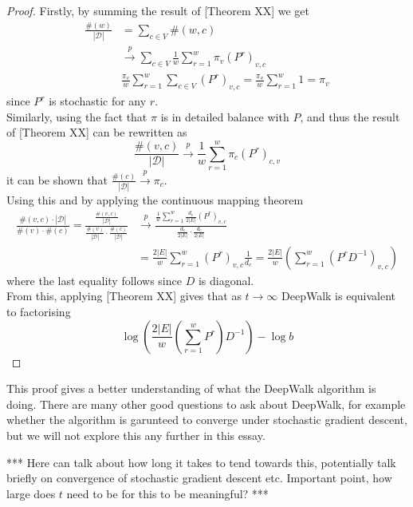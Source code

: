 \documentclass[a4paper]{article}
\newcommand{\D}{\mathcal D}
\begin{document}
\MainDeepWalk*
\begin{proof}
  Firstly, by summing the result of [Theorem XX] we get
  \begin{align*}
    \frac{\#(w)}{|\D|} &= \sum_{c \in V}\#(w, c)\\
                       &\overset{p}{\to} \sum_{c \in V} \frac{1}{w}\sum_{r=1}^w \pi_v(P^r)_{v, c}\\
                       &\frac{\pi_v}{w}\sum_{r = 1}^w \sum_{c \in V}(P^r)_{v,c} = \frac{\pi_v}{w}\sum_{r = 1}^w 1 = \pi_v
  \end{align*}
  since $P^r$ is stochastic for any $r$.\\
  Similarly, using the fact that $\pi$ is in detailed balance with $P$, and thus
  the result of [Theorem XX] can be rewritten as
  \[\frac{\#(v, c)}{|\D|} \overset{p}{\to} \frac{1}{w} \sum_{r = 1}^w \pi_c
    (P^r)_{c,v}\]
  it can be shown that $\frac{\#(c)}{|\D|} \overset{p}{\to} \pi_c$.\\
  Using this and by applying the continuous mapping theorem
  \begin{align*}
    \frac{\#(v, c) \cdot |\D|}{\#(v) \cdot \#(c)} = \frac{\frac{\#(v,c)}{|\D|}}{\frac{\#(v)}{|\D|} \cdot \frac{\#(c)}{|\D|}} & \overset{p}{\to} \frac{\frac{1}{w}\sum_{r=1}^{w} \frac{d_v}{2|E|}(P^r)_{v, c}}{\frac{d_v}{2|E|} \cdot \frac{d_c}{2|E|}}\\
                                                                                                                             &=\frac{2|E|}{w}\sum_{r=1}^w (P^r)_{v,c} \frac{1}{d_c} = \frac{2|E|}{w}\left( \sum_{r=1}^w(P^rD^{-1})_{v,c} \right)
  \end{align*}
  where the last equality follows since $D$ is diagonal.\\

  From this, applying [Theorem XX] gives that as $t \to \infty$ DeepWalk is equivalent to
  factorising
  \[\log \left( \frac{2|E|}{w}\left( \sum_{r=1}^w P^r \right)D^{-1}\right) - \log{b}\]
\end{proof}

This proof gives a better understanding of what the DeepWalk algorithm is doing.
There are many other good questions to ask about DeepWalk, for example whether
the algorithm is garunteed to converge under stochastic gradient descent, but we
will not explore this any further in this essay.

*** Here can talk about how long it takes to tend towards this, potentially talk
briefly on convergence of stochastic gradient descent etc. Important point, how
large does $t$ need to be for this to be meaningful? ***
\end{document}
